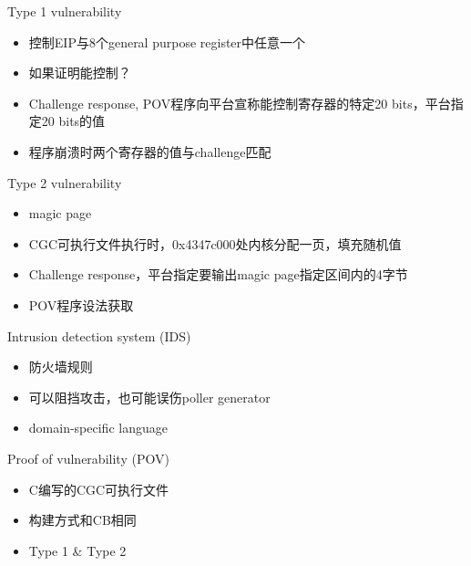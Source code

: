 \documentclass{beamer}
\begin{document}
\begin{frame}
  \begin{block}{Type 1 vulnerability}
    \begin{itemize}[<+-|alert@+>]
      \item 控制EIP与8个general purpose register中任意一个
      \item 如果证明能控制？
      \item Challenge response, POV程序向平台宣称能控制寄存器的特定20 bits，平台指定20 bits的值
      \item 程序崩溃时两个寄存器的值与challenge匹配
    \end{itemize}
  \end{block}
\end{frame}

\begin{frame}
  \begin{block}{Type 2 vulnerability}
    \begin{itemize}
      \item magic page
      \item CGC可执行文件执行时，0x4347c000处内核分配一页，填充随机值
      \item Challenge response，平台指定要输出magic page指定区间内的4字节
      \item POV程序设法获取
    \end{itemize}
  \end{block}
\end{frame}

\begin{frame}
  \begin{block}{Intrusion detection system (IDS)}
    \begin{itemize}
      \item 防火墙规则
      \item 可以阻挡攻击，也可能误伤poller generator
      \item domain-specific language
    \end{itemize}
  \end{block}
\end{frame}

\begin{frame}
  \begin{block}{Proof of vulnerability (POV)}
    \begin{itemize}
      \item C编写的CGC可执行文件
      \item 构建方式和CB相同
      \item Type 1 \& Type 2
    \end{itemize}
  \end{block}
\end{frame}
\end{document}
